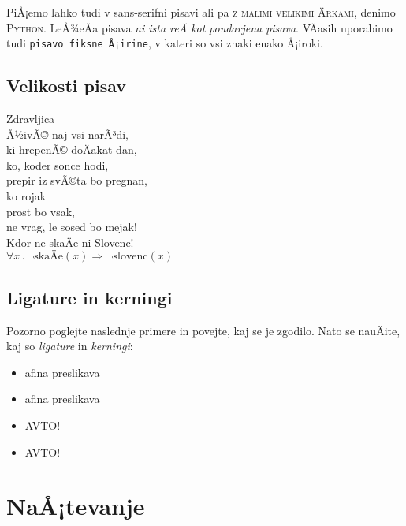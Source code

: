 \documentclass[a4paper]{article}
\begin{document}
PiÅ¡emo lahko tudi v \textsf{sans-serifni pisavi} ali pa \textsc{z malimi velikimi Ärkami},
denimo \textsc{Python}. LeÅ¾eÄa pisava \textsl{ni ista reÄ kot} \emph{poudarjena pisava}.
VÄasih uporabimo tudi \texttt{pisavo fiksne Å¡irine}, v kateri so vsi znaki enako Å¡iroki.


\subsection{Velikosti pisav}

\begin{center}
{\Huge Zdravljica} \\
{\Huge Å½ivÃ© naj vsi narÃ³di,} \\
{\huge ki hrepenÃ© doÄakat dan,} \\
{\LARGE ko, koder sonce hodi,} \\
{\Large prepir iz svÃ©ta bo pregnan,} \\
{\large ko rojak} \\
{\normalsize prost bo vsak,} \\
{\footnotesize ne vrag, le sosed bo mejak!} \\
{\scriptsize Kdor ne skaÄe ni Slovenc!} \\
{\tiny $\forall x \,.\, \lnot\mathrm{skaÄe}(x) \Rightarrow \lnot\mathrm{slovenc}(x)$}
\end{center}

\subsection{Ligature in kerningi}

Pozorno poglejte naslednje primere in povejte, kaj se je zgodilo. Nato se nauÄite, kaj so
\emph{ligature} in \emph{kerningi}:
%
\begin{itemize}
\item afina preslikava
\item {a}{f}{i}{n}{a} preslikava
\item AVTO!
\item {A}{V}{T}{O}!
\end{itemize}


\section{NaÅ¡tevanje}
\end{document}

